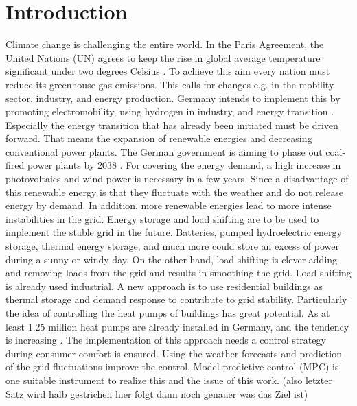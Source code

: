 \chapter{Introduction}
\label{ch:introduction}
Climate change is challenging the entire world. In the Paris Agreement, the United Nations (UN) agrees to keep the rise in global average temperature significant under two degrees Celsius \cite{UnitedNations.2015}. To achieve this aim every nation must reduce its greenhouse gas emissions. This calls for changes e.g. in the mobility sector, industry, and energy production. Germany intends to implement this by promoting electromobility, using hydrogen in industry, and energy transition \cite{Deutschlandfunk.24.06.2021}. Especially the energy transition that has already been initiated must be driven forward. That means the expansion of renewable energies and decreasing conventional power plants. The German government is aiming to phase out coal-fired power plants by 2038 \cite{bundesregierung.2021}. For covering the energy demand, a high increase in photovoltaics and wind power is necessary in a few years. 
\newline
Since a disadvantage of this renewable energy is that they fluctuate with the weather and do not release energy by demand. In addition, more renewable energies lead to more intense instabilities in the grid. Energy storage and load shifting are to be used to implement the stable grid in the future. Batteries, pumped hydroelectric energy storage, thermal energy storage, and much more could store an excess of power during a sunny or windy day. On the other hand, load shifting is clever adding and removing loads from the grid and results in smoothing the grid. Load shifting is already used industrial. A new approach is to use residential buildings as thermal storage and demand response to contribute to grid stability. Particularly the idea of controlling the heat pumps of buildings has great potential. As at least 1.25 million heat pumps are already installed in Germany, and the tendency is increasing \cite{BMW.2021}.
\newline
The implementation of this approach needs a control strategy during consumer comfort is ensured. Using the weather forecasts and prediction of the grid fluctuations improve the control. Model predictive control (MPC) is one suitable instrument to realize this and the issue of this work. (also letzter Satz wird halb gestrichen hier folgt dann noch genauer was das Ziel ist)


